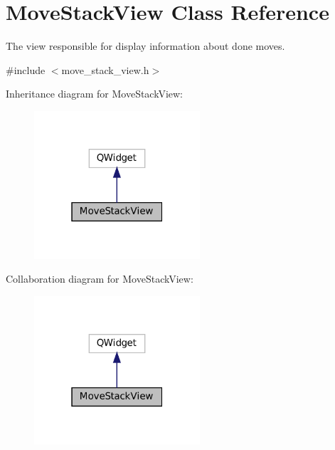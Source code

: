 \hypertarget{class_move_stack_view}{}\section{Move\+Stack\+View Class Reference}
\label{class_move_stack_view}


The view responsible for display information about done moves.  




{\ttfamily \#include $<$move\+\_\+stack\+\_\+view.\+h$>$}



Inheritance diagram for Move\+Stack\+View\+:
\nopagebreak
\begin{figure}[H]
\begin{center}
\leavevmode
\includegraphics[width=175pt]{class_move_stack_view__inherit__graph}
\end{center}
\end{figure}


Collaboration diagram for Move\+Stack\+View\+:
\nopagebreak
\begin{figure}[H]
\begin{center}
\leavevmode
\includegraphics[width=175pt]{class_move_stack_view__coll__graph}
\end{center}
\end{figure}

